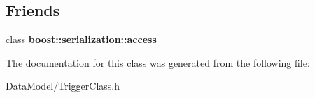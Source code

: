 \subsection*{Friends}
\begin{DoxyCompactItemize}
\item 
\hypertarget{classTriggerClass_ac98d07dd8f7b70e16ccb9a01abf56b9c}{class {\bfseries boost\-::serialization\-::access}}\label{classTriggerClass_ac98d07dd8f7b70e16ccb9a01abf56b9c}

\end{DoxyCompactItemize}


The documentation for this class was generated from the following file\-:\begin{DoxyCompactItemize}
\item 
Data\-Model/Trigger\-Class.\-h\end{DoxyCompactItemize}
